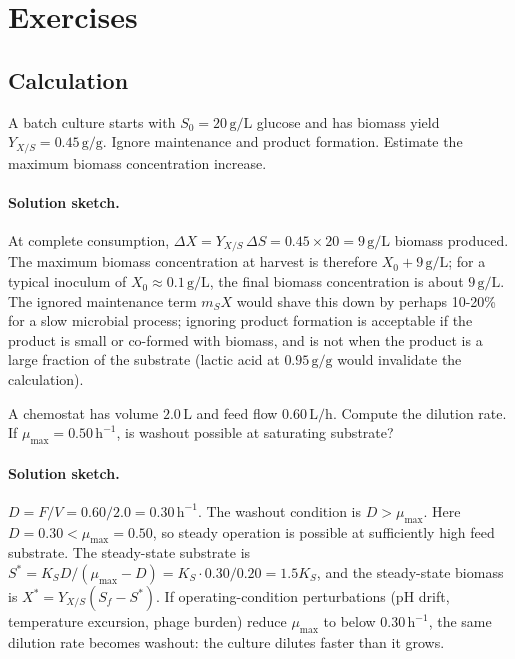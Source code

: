 \section{Exercises}

\subsection*{Calculation}

\begin{exercise}
A batch culture starts with $S_0 = 20\,\text{g}/\text{L}$ glucose and
has biomass yield $Y_{X/S} = 0.45\,\text{g}/\text{g}$. Ignore
maintenance and product formation. Estimate the maximum biomass
concentration increase.
\end{exercise}

\paragraph{Solution sketch.}
At complete consumption, $\Delta X = Y_{X/S}\,\Delta S = 0.45 \times
20 = 9\,\text{g}/\text{L}$ biomass produced. The maximum biomass
concentration at harvest is therefore $X_0 + 9\,\text{g}/\text{L}$;
for a typical inoculum of $X_0 \approx 0.1\,\text{g}/\text{L}$, the
final biomass concentration is about $9\,\text{g}/\text{L}$. The
ignored maintenance term $m_S X$ would shave this down by perhaps
10-20\% for a slow microbial process; ignoring product formation is
acceptable if the product is small or co-formed with biomass, and is
not when the product is a large fraction of the substrate (lactic
acid at $0.95\,\text{g}/\text{g}$ would invalidate the calculation).

\begin{exercise}
A chemostat has volume $2.0\,\text{L}$ and feed flow
$0.60\,\text{L}/\text{h}$. Compute the dilution rate. If
$\mu_{\max}=0.50\,\text{h}^{-1}$, is washout possible at saturating
substrate?
\end{exercise}

\paragraph{Solution sketch.}
$D = F/V = 0.60/2.0 = 0.30\,\text{h}^{-1}$. The washout condition is
$D > \mu_{\max}$. Here $D = 0.30 < \mu_{\max} = 0.50$, so steady
operation is possible at sufficiently high feed substrate. The
steady-state substrate is
$S^\ast = K_S D / (\mu_{\max} - D) = K_S \cdot 0.30 / 0.20 = 1.5 K_S$,
and the steady-state biomass is $X^\ast = Y_{X/S}(S_f - S^\ast)$. If
operating-condition perturbations (pH drift, temperature excursion,
phage burden) reduce $\mu_{\max}$ to below $0.30\,\text{h}^{-1}$, the
same dilution rate becomes washout: the culture dilutes faster than
it grows.

